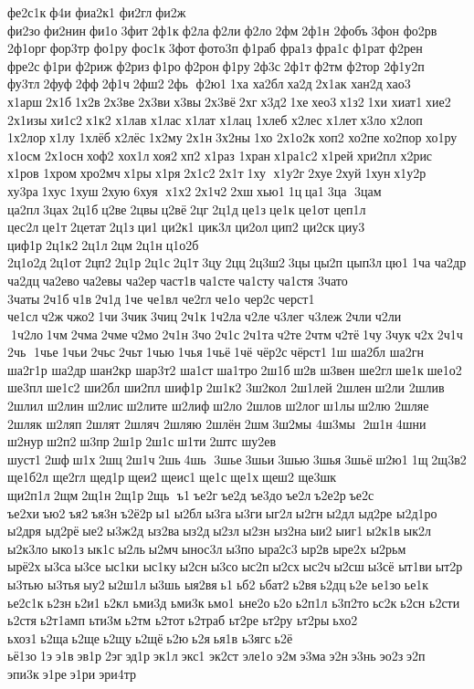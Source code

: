 фе2с1к ф4и 
фиа2к1 	фи2гл фи2ж 	фи2зо фи2нин фи1о 3фит 2ф1к ф2ла ф2ли ф2ло 2фм 2ф1н 	2фобъ 3фон 	фо2рв 
2ф1орг фор3тр 	фо1ру 	фос1к 3фот фото3п 	ф1раб 	фра1з 	фра1с 	ф1рат 	ф2рен 	фре2с ф1ри 	ф2риж 	ф2риз ф1ро 	ф2рон ф1ру 2ф3с 2ф1т ф2тм 	ф2тор 	2ф1у2п 	фу3тл 2фуф 2фф 2ф1ч 2фш2 2фь  ф2ю1 1ха 	ха2бл ха2д 2х1ак 	хан2д хао3 	х1арш 2х1б 1х2в 2х3ве 2х3ви х3вы 2х3вё 2хг х3д2 1хе хео3 х1з2 1хи 	хиат1 хие2 
2х1изы хи1с2 х1к2 	х1лав 	х1лас 	х1лат 	х1лац 	1хлеб 	х2лес 	х1лет х3ло  	х2лоп 
1х2лор х1лу 	1хлёб 	х2лёс 1х2му 2х1н 3х2ны 1хо 	2х1о2к хоп2 	хо2пе хо2пор 	хо1ру 	х1осм 
2х1осн хоф2 	хох1л хоя2 хп2 	х1раз 	1хран х1ра1с2 	х1рей хри2пл 	х2рис 	х1ров 	1хром хро2мч х1ры х1ря 2х1с2 2х1т 1ху  х1у2г 2хуе 2хуй 1хун х1у2р 	ху3ра 1хус 1хуш 2хую 6хуя  х1х2 2х1ч2 2хш хью1 1ц ца1 3ца  3цам 	ца2пл 3цах 2ц1б ц2ве 2цвы ц2вё 2цг 2ц1д це1з це1к 	це1от 	цеп1л 	цес2л це1т 2цетат 2ц1з ци1 ци2к1 	цик3л 	ци2ол цип2 	ци2ск циу3 	циф1р 2ц1к2 2ц1л 2цм 2ц1н ц1о2б 	2ц1о2д 2ц1от 2цп2 2ц1р 2ц1с 2ц1т 3цу 2цц 2ц3ш2 3цы цы2п 	цып3л цю1 1ча 	ча2др 	ча2дц ча2ево ча2евы 	ча2ер част1в ча1сте ча1сту ча1стя 	3чато 	3чаты 2ч1б ч1в 2ч1д 1че 	че1вл 	че2гл че1о 	чер2с черст1 	че1сл ч2ж чжо2 1чи 3чик 3чиц 2ч1к 1ч2ла ч2ле 	ч3лег 	ч3леж 2чли ч2ли  1ч2ло 1чм 2чма 2чме ч2мо 2ч1н 3чо 2ч1с 2ч1та ч2те 2чтм ч2тё 1чу 3чук ч2х 2ч1ч 2чь  1чье 1чьи 2чьс 2чьт 1чью 1чья 1чьё 1чё 	чёр2с чёрст1 1ш 	ша2бл 	ша2гн 
ша2г1р 	ша2др шан2кр 
шар3т2 	ша1ст ша1тро 2ш1б ш2в 	ш3вен 	ше2гл ше1к ше1о2 	ше3пл ше1с2 	ши2бл 	ши2пл 	шиф1р 2ш1к2 
3ш2кол 
2ш1лей 	2шлен ш2ли  	2шлив 	2шлил 	ш2лин 	ш2лис ш2лите 	ш2лиф ш2ло  	2шлов 	ш2лог ш1лы ш2лю 	2шляе 	2шляк 	ш2ляп 	2шлят 	2шляч 	2шляю 	2шлён 2шм 3ш2мы 	4ш3мы  2ш1н 4шни 	ш2нур ш2п2 ш3пр 2ш1р 2ш1с ш1ти 2штс 	шу2ев 	шуст1 2шф ш1х 2шц 2ш1ч 2шь 4шь  3шье 3шьи 3шью 3шья 3шьё ш2ю1 1щ 2щ3в2 
ще1б2л 	ще2гл 	щед1р щеи2 	щеис1 ще1с ще1х щеш2 	ще3шк 
щи2п1л 2щм 2щ1н 2щ1р 2щь  ъ1 ъе2г ъе2д 	ъе3до ъе2л ъ2е2р ъе2с 	ъе2хи ъю2 ъя2 ъя3н ъ2ё2р ы1 ы2бл ы3га ы3ги ыг2л ы2гн ы2дл 	ыд2ре 
ы2д1ро 	ы2дря 	ыд2рё ые2 ы3ж2д 	ыз2ва ыз2д ы2зл ы2зн 	ыз2на ыи2 ыиг1 ы2к1в ык2л 
ы2к3ло 	ыко1з ык1с ы2ль ы2мч ынос3л ы3по 
ыра2с3 ыр2в 	ыре2х 	ы2рьм 	ырё2х ы3са ы3се 	ыс1ки 	ыс1ку ы2сн ы3со ыс2п ы2сх ыс2ч ы2сш ы3сё 	ыт1ви ыт2р 	ы3тью 	ы3тья ыу2 ы2ш1л ы3шь 	ыя2вя ь1 ьб2 	ьбат2 ь2вя ь2дц ь2е 	ье1зо ье1к 
ье2с1к ь2зн ь2и1 ь2кл 	ьми3д 	ьми3к ьмо1 	ьне2о ь2о ь2п1л 
ь3п2то ьс2к ь2сн 	ь2сти 	ь2стя ь2т1амп 	ьти3м ь2тм 	ь2тот ь2траб 	ьт2ре 	ьт2ру 	ьт2ры ьхо2 	ьхоз1 ь2ща ь2ще ь2щу ь2щё ь2ю ь2я ья1в 	ь3ягс ь2ё 	ьё1зо 1э э1в эв1р 2эг эд1р эк1л экс1 	эк2ст 	эле1о э2м э3ма э2н э3нь эо2з э2п 	эпи3к э1ре э1ри эри4тр 
